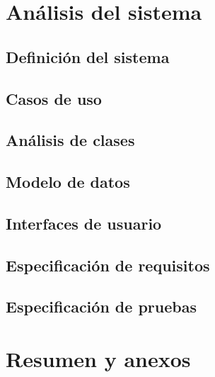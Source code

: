 \documentclass[12pt, spanish, a4paper]{article}
\begin{document}
	\section{Análisis del sistema}
	
	\subsection{Definición del sistema}
	
	\lipsum[1]
	
	\subsection{Casos de uso}
	
	\lipsum[2]
	
	\subsection{Análisis de clases}
	
	\lipsum[3]
	
	\subsection{Modelo de datos}
	
	\lipsum[1]
	
	\subsection{Interfaces de usuario}
	
	\lipsum[4]
	
	\subsection{Especificación de requisitos}
	
	\lipsum[5]
	
	\subsection{Especificación de pruebas}
	
	\section{Resumen y anexos}
	
	\lipsum[33]
	
\end{document}
